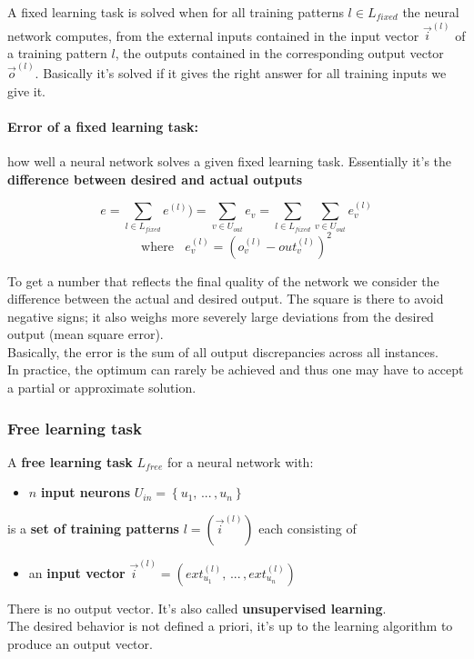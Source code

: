 A fixed learning task is solved when for all training patterns $l \in L_{fixed}$ the neural network computes, from the external inputs contained in the input vector $\vec{i}^{(l)}$ of a training pattern $l$, the outputs contained in the corresponding output vector $\vec{o}^{(l)}$. Basically it's solved if it gives the right answer for all training inputs we give it.

\paragraph{Error of a fixed learning task:} how well a neural network solves a given fixed learning task. Essentially it's the \textbf{difference between desired and actual outputs}

$$ e = \sum_{l \in L_{fixed}} e^{(l)} ) = \sum_{v \in U_{out}} e_v = \sum_{l \in L_{fixed}} \sum_{v \in U_{out}} e_v^{(l)} $$
$$ \text{where } \;\; e_v^{(l)} = \left(o_v^{(l)} - out_v^{(l)}\right)^2 $$

To get a number that reflects the final quality of the network we consider the difference between the actual and desired output. The square is there to avoid negative signs; it also weighs more severely large deviations from the desired output (mean square error).\\
Basically, the error is the sum of all output discrepancies across all instances.\\
In practice, the optimum can rarely be achieved and thus one may have to accept a partial or approximate solution.

\newpage

\subsubsection{Free learning task}
A \textbf{free learning task} $L_{free}$ for a neural network with: 
\begin{itemize}
	\item $n$ \textbf{input neurons} $U_{in} = \left\{u_1, \, ... \, , u_n\right\}$ 
\end{itemize}
is a \textbf{set of training patterns} $l = \left(\vec{i}^{(l)}\right)$ each consisting of
\begin{itemize}
	\item an \textbf{input vector} $\vec{i}^{(l)} = \left(ext_{u_1}^{(l)}, \, ... \, , ext_{u_n}^{(l)}\right)$
\end{itemize}

There is no output vector. It's also called \textbf{unsupervised learning}.\\
The desired behavior is not defined a priori, it's up to the learning algorithm to produce an output vector.\\

